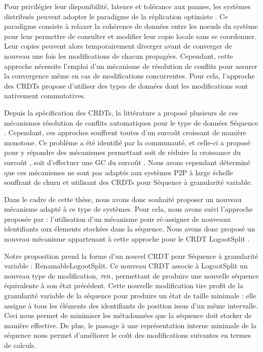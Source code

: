 Pour privilégier leur disponibilité, latence et tolérance aux pannes, les systèmes distribués peuvent adopter le paradigme de la réplication optimiste \cite{2005-optimistic-replication-saito}.
Ce paradigme consiste à relaxer la cohérence de données entre les noeuds du système pour leur permettre de consulter et modifier leur copie locale sans se coordonner.
Leur copies peuvent alors temporairement diverger avant de converger de nouveau une fois les modifications de chacun propagées.
Cependant, cette approche nécessite l'emploi d'un mécanisme de résolution de conflits pour assurer la convergence même en cas de modifications concurrentes.
Pour cela, l'approche des \acp{CRDT} \cite{2007-crdt-shapiro,shapiro_2011_crdt} propose d'utiliser des types de données dont les modifications sont nativement commutatives.

Depuis la spécification des \acp{CRDT}, la littérature a proposé plusieurs de ces mécanismes résolution de conflits automatiques pour le type de données Séquence \cite{2006-woot-oster,ROH2011354,2009-treedoc-preguica,2009-logoot-weiss}.
Cependant, ces approches souffrent toutes d'un surcoût croissant de manière monotone.
Ce problème a été identifié par la communauté, et celle-ci a proposé pour y répondre des mécanismes permettant soit de réduire la croissance du surcoût \cite{lseq2013,lseq2017}, soit d'effectuer une \ac{GC} du surcoût \cite{ROH2011354,letia:hal-01248270,zawirski:hal-01248197}.
Nous avons cependant déterminé que ces mécanismes ne sont pas adaptés aux systèmes \ac{P2P} à large échelle souffrant de churn et utilisant des \acp{CRDT} pour Séquence à granularité variable.

Dans le cadre de cette thèse, nous avons donc souhaité proposer un nouveau mécanisme adapté à ce type de systèmes.
Pour cela, nous avons suivi l'approche proposée par \cite{letia:hal-01248270,zawirski:hal-01248197} : l'utilisation d'un mécanisme pour ré-assigner de nouveaux identifiants aux élements stockées dans la séquence.
Nous avons donc proposé un nouveau mécanisme appartenant à cette approche pour le \ac{CRDT} LogootSplit \cite{2013-logootsplit}.

Notre proposition prend la forme d'un nouvel \ac{CRDT} pour Séquence à granularité variable : RenamableLogootSplit.
Ce nouveau \ac{CRDT} associe à LogootSplit un nouveau type de modification, $\mathit{ren}$, permettant de produire une nouvelle séquence équivalente à son état précédent.
Cette nouvelle modification tire profit de la granularité variable de la séquence pour produire un état de taille minimale : elle assigne à tous les éléments des identifiants de position issus d'un même intervalle.
Ceci nous permet de minimiser les métadonnées que la séquence doit stocker de manière effective.
De plus, le passage à une représentation interne minimale de la séquence nous permet d'améliorer le coût des modifications suivantes en termes de calculs.

